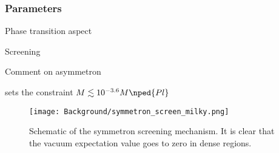     \subsubsection{Parameters}




    \begin{bullets}
        \item Phase transition aspect
        \item Screening
        \item Comment on asymmetron
    \end{bullets}


    \citet{burrageAccurateComputationScreening2024} sets the constraint $M \lesssim 10^{-3.6} M\nped{Pl}$
    \begin{figure}[h]
        \centering
        {\texttt{[image: Background/symmetron\_screen\_milky.png]}}
        {\caption{Schematic of the symmetron screening mechanism. It is clear that the vacuum expectation value goes to zero in dense regions.}}
        \label{fig:cosmo:quintessence:asymmetron_demo}
    \end{figure}








    








    